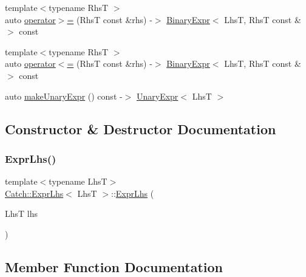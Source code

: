 \begin{DoxyCompactItemize}
\item 
{\footnotesize template$<$typename RhsT $>$ }\\auto \mbox{\hyperlink{classCatch_1_1ExprLhs_aff594ae5b957105c517a6257d2e730f0}{operator$>$=}} (RhsT const \&rhs) -\/$>$ \mbox{\hyperlink{classCatch_1_1BinaryExpr}{Binary\+Expr}}$<$ LhsT, RhsT const \&$>$ const
\item 
{\footnotesize template$<$typename RhsT $>$ }\\auto \mbox{\hyperlink{classCatch_1_1ExprLhs_a6bd8a22c1a7fe2f66d71d7196f20af4f}{operator$<$=}} (RhsT const \&rhs) -\/$>$ \mbox{\hyperlink{classCatch_1_1BinaryExpr}{Binary\+Expr}}$<$ LhsT, RhsT const \&$>$ const
\item 
auto \mbox{\hyperlink{classCatch_1_1ExprLhs_ab68bd6d5d3ae21b7fba9010150fba95d}{make\+Unary\+Expr}} () const -\/$>$ \mbox{\hyperlink{classCatch_1_1UnaryExpr}{Unary\+Expr}}$<$ LhsT $>$
\end{DoxyCompactItemize}


\subsection{Constructor \& Destructor Documentation}
\mbox{\label{classCatch_1_1ExprLhs_ad22c6af1a7d6993240624d299714a479}} 
\subsubsection{\texorpdfstring{Expr\+Lhs()}{ExprLhs()}}
{\footnotesize\ttfamily template$<$typename LhsT$>$ \\
\mbox{\hyperlink{classCatch_1_1ExprLhs}{Catch\+::\+Expr\+Lhs}}$<$ LhsT $>$\+::\mbox{\hyperlink{classCatch_1_1ExprLhs}{Expr\+Lhs}} (\begin{DoxyParamCaption}\item[{LhsT}]{lhs }\end{DoxyParamCaption})\hspace{0.3cm}{\ttfamily [inline]}}



\subsection{Member Function Documentation}
\mbox{\label{classCatch_1_1ExprLhs_ab68bd6d5d3ae21b7fba9010150fba95d}} 
